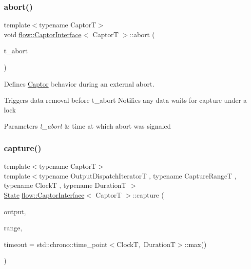 \subsubsection{\texorpdfstring{abort()}{abort()}}
{\footnotesize\ttfamily template$<$typename CaptorT$>$ \\
void \hyperlink{classflow_1_1_captor_interface}{flow\+::\+Captor\+Interface}$<$ CaptorT $>$\+::abort (\begin{DoxyParamCaption}\item[{const \hyperlink{classflow_1_1_captor_interface_a2b87d20d17e8d1437941bd98fe514bc8}{stamp\+\_\+type} \&}]{t\+\_\+abort }\end{DoxyParamCaption})\hspace{0.3cm}{\ttfamily [inline]}}



Defines \hyperlink{classflow_1_1_captor}{Captor} behavior during an external abort. 

Triggers data removal before {\ttfamily t\+\_\+abort} Notifies any data waits for capture under a lock


\begin{DoxyParams}{Parameters}
{\em t\+\_\+abort} & time at which abort was signaled \\
\hline
\end{DoxyParams}
\mbox{\label{classflow_1_1_captor_interface_ae95095d924214605bfeac70d0bd5ad35}} 
\subsubsection{\texorpdfstring{capture()}{capture()}\hspace{0.1cm}{\footnotesize\ttfamily [1/2]}}
{\footnotesize\ttfamily template$<$typename CaptorT$>$ \\
template$<$typename Output\+Dispatch\+IteratorT , typename Capture\+RangeT , typename ClockT , typename DurationT $>$ \\
\hyperlink{namespaceflow_adefe9726e597eb50c46f0f6a202018e9}{State} \hyperlink{classflow_1_1_captor_interface}{flow\+::\+Captor\+Interface}$<$ CaptorT $>$\+::capture (\begin{DoxyParamCaption}\item[{Output\+Dispatch\+IteratorT \&\&}]{output,  }\item[{Capture\+RangeT \&\&}]{range,  }\item[{const std\+::chrono\+::time\+\_\+point$<$ ClockT, DurationT $>$}]{timeout = {\ttfamily std\+:\+:chrono\+:\+:time\+\_\+point$<$ClockT,~DurationT$>$\+:\+:max()} }\end{DoxyParamCaption})\hspace{0.3cm}{\ttfamily [inline]}}



